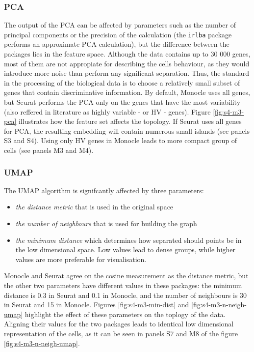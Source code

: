 \subsubsection{PCA}
The output of the PCA can be affected by parameters such as the number of principal components or the precision of the calculation (the \verb|irlba| package performs an approximate PCA calculation), but the difference between the packages lies in the feature space. Although the data contains up to 30 000 genes, most of them are not appropiate for describing the cells behaviour, as they would introduce more noise than perform any significant separation. Thus, the standard in the processing of the biological data is to choose a relatively small subset of genes that contain discriminative information. By default, Monocle uses all genes, but Seurat performs the PCA only on the genes that have the most variability \cite{Townes2019} (also reffered in literature as highly variable - or HV - genes). Figure \ref{fig:s4-m3-pca} illustrates how the feature set affects the topology. If Seurat uses all genes for PCA, the resulting embedding will contain numerous small islands (see panels S3 and S4). Using only HV genes in Monocle leads to more compact group of cells (see panels M3 and M4).

\subsubsection{UMAP}
The UMAP algorithm is signifcantly affected by three parameters:
\begin{itemize}
    \item \textit{the distance metric} that is used in the original space
    \item \textit{the number of neighbours} that is used for building the graph
    \item \textit{the minimum distance} which determines how separated should points be in the low dimensional space. Low values lead to dense groups, while higher values are more preferable for visualisation.
\end{itemize}

Monocle and Seurat agree on the cosine measurement as the distance metric, but the other two parameters have different values in these packages: the minimum distance is 0.3 in Seurat and 0.1 in Monocle, and the number of neighbours is 30 in Seurat and 15 in Monocle. Figures \ref{fig:s4-m3-min-dist} and \ref{fig:s4-m3-n-neigh-umap} highlight the effect of these parameters on the toplogy of the data. Aligning their values for the two packages leads to identical low dimensional representation of the cells, as it can be seen in panels S7 and M8 of the figure \ref{fig:s4-m3-n-neigh-umap}.

